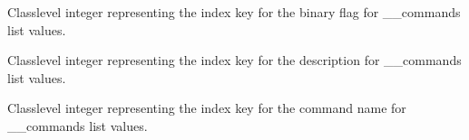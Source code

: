 \documentclass[letterpaper,10pt,english]{sphinxmanual}
\begin{document}
\begin{fulllineitems}
\begin{fulllineitems}
\end{fulllineitems}


\begin{fulllineitems}
\label{\detokenize{PodCommands:PodCommands.POD_Commands.__BINARY}}
\pysigstartsignatures
{}
\pysigstopsignatures
\sphinxAtStartPar
Class\sphinxhyphen{}level integer representing the index key for the binary flag for \_\_commands     list values.

\end{fulllineitems}


\begin{fulllineitems}
\label{\detokenize{PodCommands:PodCommands.POD_Commands.__DESCRIPTION}}
\pysigstartsignatures
{}
\pysigstopsignatures
\sphinxAtStartPar
Class\sphinxhyphen{}level integer representing the index key for the description for \_\_commands     list values.

\end{fulllineitems}


\begin{fulllineitems}
\label{\detokenize{PodCommands:PodCommands.POD_Commands.__NAME}}
\pysigstartsignatures
{}
\pysigstopsignatures
\sphinxAtStartPar
Class\sphinxhyphen{}level integer representing the index key for the command name for \_\_commands     list values.

\end{fulllineitems}



\end{fulllineitems}
\end{document}
